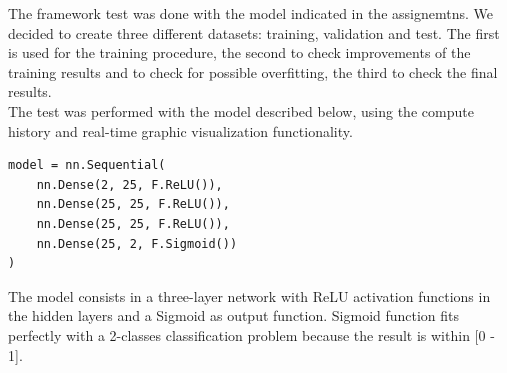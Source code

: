 The framework test was done with the model indicated in the assignemtns. We decided to create three different datasets: training, validation and test. The first is used for the training procedure, the second to check improvements of the training results and to check for possible overfitting, the third to check the final results. \\
The test was performed with the model described below, using the compute history and real-time graphic visualization functionality.
\begin{verbatim}
model = nn.Sequential(
	nn.Dense(2, 25, F.ReLU()),
	nn.Dense(25, 25, F.ReLU()),
	nn.Dense(25, 25, F.ReLU()),
	nn.Dense(25, 2, F.Sigmoid())
)  
\end{verbatim}
The model consists in a three-layer network with ReLU activation functions in the hidden layers and a Sigmoid as output function. Sigmoid function fits perfectly with a 2-classes classification problem because the result is within [0 - 1]. 

